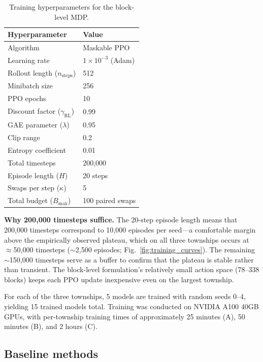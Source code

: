 \documentclass[preprint,12pt]{elsarticle}
\begin{document}
\begin{table}[htbp]
\centering
\caption{Training hyperparameters for the block-level MDP.}
\label{tab:hyperparams}
\begin{tabular}{ll}
\toprule
Hyperparameter & Value \\
\midrule
Algorithm & Maskable PPO \\
Learning rate & $1 \times 10^{-3}$ (Adam) \\
Rollout length ($n_{\text{steps}}$) & 512 \\
Minibatch size & 256 \\
PPO epochs & 10 \\
Discount factor ($\gamma_{\text{RL}}$) & 0.99 \\
GAE parameter ($\lambda$) & 0.95 \\
Clip range & 0.2 \\
Entropy coefficient & 0.01 \\
Total timesteps & 200{,}000 \\
Episode length ($H$) & 20 steps \\
Swaps per step ($\kappa$) & 5 \\
Total budget ($B_{\max}$) & 100 paired swaps \\
\bottomrule
\end{tabular}
\end{table}

\textbf{Why 200{,}000 timesteps suffice.} The 20-step episode length means that 200{,}000 timesteps correspond to 10{,}000 episodes per seed---a comfortable margin above the empirically observed plateau, which on all three townships occurs at $\approx$50{,}000 timesteps ($\sim$2{,}500 episodes; Fig.~\ref{fig:training_curves}). The remaining $\sim$150{,}000 timesteps serve as a buffer to confirm that the plateau is stable rather than transient. The block-level formulation's relatively small action space (78--338 blocks) keeps each PPO update inexpensive even on the largest township.

For each of the three townships, 5 models are trained with random seeds 0--4, yielding 15 trained models total. Training was conducted on NVIDIA A100 40GB GPUs, with per-township training times of approximately 25 minutes (A), 50 minutes (B), and 2 hours (C).

\subsection{Baseline methods}
\label{sec:baselines}
\end{document}

